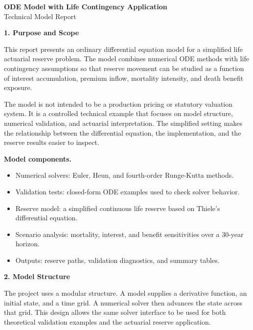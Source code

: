 \documentclass[11pt,letterpaper]{article}
\newcommand{\reportsection}[1]{%
  \vspace{5pt}
  \begin{center}
    {\large\bfseries #1}
  \end{center}
  \vspace{1pt}
}
\newcommand{\reportsubsection}[1]{%
  \vspace{5pt}
  {\normalsize\bfseries #1.}
}
\begin{document}
\begin{center}
  {\Large\bfseries ODE Model with Life Contingency Application}\\[4pt]
  {\normalsize Technical Model Report}
\end{center}

\reportsection{1. Purpose and Scope}

This report presents an ordinary differential equation model for a simplified life actuarial reserve problem. The model combines numerical ODE methods with life contingency assumptions so that reserve movement can be studied as a function of interest accumulation, premium inflow, mortality intensity, and death benefit exposure.

The model is not intended to be a production pricing or statutory valuation system. It is a controlled technical example that focuses on model structure, numerical validation, and actuarial interpretation. The simplified setting makes the relationship between the differential equation, the implementation, and the reserve results easier to inspect.

\reportsubsection{Model components}
\begin{itemize}[leftmargin=18pt,itemsep=2pt,topsep=3pt]
  \item Numerical solvers: Euler, Heun, and fourth-order Runge-Kutta methods.
  \item Validation tests: closed-form ODE examples used to check solver behavior.
  \item Reserve model: a simplified continuous life reserve based on Thiele's differential equation.
  \item Scenario analysis: mortality, interest, and benefit sensitivities over a 30-year horizon.
  \item Outputs: reserve paths, validation diagnostics, and summary tables.
\end{itemize}

\newpage
\reportsection{2. Model Structure}

The project uses a modular structure. A model supplies a derivative function, an initial state, and a time grid. A numerical solver then advances the state across that grid. This design allows the same solver interface to be used for both theoretical validation examples and the actuarial reserve application.
\end{document}

